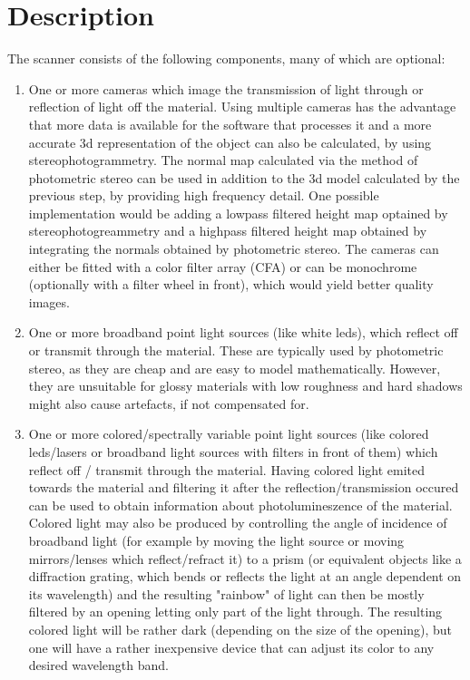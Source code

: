 \documentclass[11pt, twoside, listof=totocnumbered, bibliography=totocnumbered]{scrartcl}
\begin{document}
\section{Description}
The scanner consists of the following components, many of which are optional:
\begin{enumerate}
	\item One or more cameras which image the transmission of light through or reflection of light off the material. Using multiple cameras has the advantage that more data is available for the software that processes it and a more accurate 3d representation of the object can also be calculated, by using stereophotogrammetry. The normal map calculated via the method of photometric stereo can be used in addition to the 3d model calculated by the previous step, by providing high frequency detail. One possible implementation would be adding a lowpass filtered height map optained by stereophotogreammetry and a highpass filtered height map obtained by integrating the normals obtained by photometric stereo. The cameras can either be fitted with a color filter array (CFA) or can be monochrome (optionally with a filter wheel in front), which would yield better quality images.
	\item One or more broadband point light sources (like white leds), which reflect off or transmit through the material. These are typically used by photometric stereo, as they are cheap and are easy to model mathematically. However, they are unsuitable for glossy materials with low roughness and hard shadows might also cause artefacts, if not compensated for.
	\item One or more colored/spectrally variable point light sources (like colored leds/lasers or broadband light sources with filters in front of them) which reflect off / transmit through the material. Having colored light emited towards the material and filtering it after the reflection/transmission occured can be used to obtain information about photolumineszence of the material. Colored light may also be produced by controlling the angle of incidence of broadband light (for example by moving the light source or moving mirrors/lenses which reflect/refract it) to a prism (or equivalent objects like a diffraction grating, which bends or reflects the light at an angle dependent on its wavelength) and the resulting "rainbow" of light can then be mostly filtered by an opening letting only part of the light through. The resulting colored light will be rather dark (depending on the size of the opening), but one will have a rather inexpensive device that can adjust its color to any desired wavelength band.

\end{enumerate}
\end{document}
